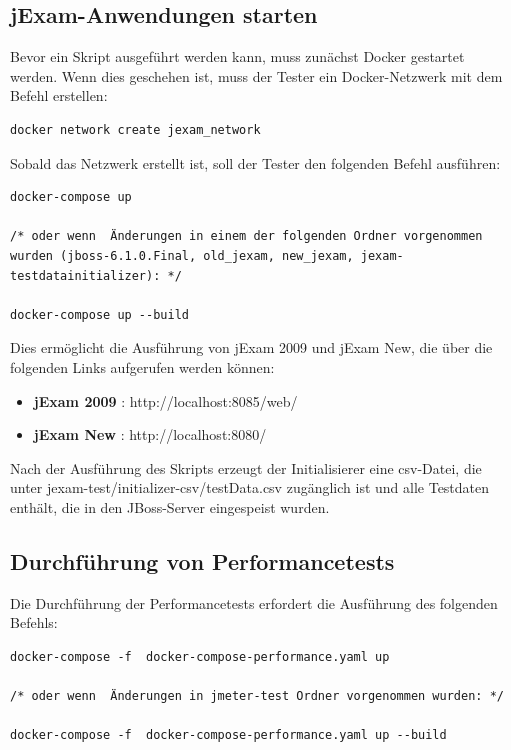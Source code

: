 \subsection{jExam-Anwendungen starten}

Bevor ein Skript ausgeführt werden kann, muss
zunächst Docker gestartet werden. Wenn dies
geschehen ist, muss der Tester ein Docker-Netzwerk
mit dem Befehl erstellen:

\begin{lstlisting}[caption={Docker Network Einrichtung}]
docker network create jexam_network
\end{lstlisting}

Sobald das Netzwerk erstellt ist, soll der Tester
den folgenden Befehl ausführen:

\begin{lstlisting}[caption={Befehl zum Starten der jExam-Plattformen}]
docker-compose up

/* oder wenn  Änderungen in einem der folgenden Ordner vorgenommen wurden (jboss-6.1.0.Final, old_jexam, new_jexam, jexam-testdatainitializer): */

docker-compose up --build
\end{lstlisting}

Dies ermöglicht die Ausführung von jExam 2009 und jExam
New, die über die folgenden Links aufgerufen werden können:

\begin{itemize}
    \item[] \textbf{jExam 2009} : http://localhost:8085/web/
    \item[] \textbf{jExam New} : http://localhost:8080/
\end{itemize}

Nach der Ausführung des Skripts erzeugt der
Initialisierer eine csv-Datei, die unter
jexam-test/initializer-csv/testData.csv
zugänglich ist und alle Testdaten enthält,
die in den JBoss-Server eingespeist wurden.


\subsection{Durchführung von Performancetests}

Die Durchführung der Performancetests erfordert die
Ausführung des folgenden Befehls:

\begin{lstlisting}[caption={Befehl zur Durchführung der Performancetests}]
docker-compose -f  docker-compose-performance.yaml up

/* oder wenn  Änderungen in jmeter-test Ordner vorgenommen wurden: */

docker-compose -f  docker-compose-performance.yaml up --build
\end{lstlisting}

